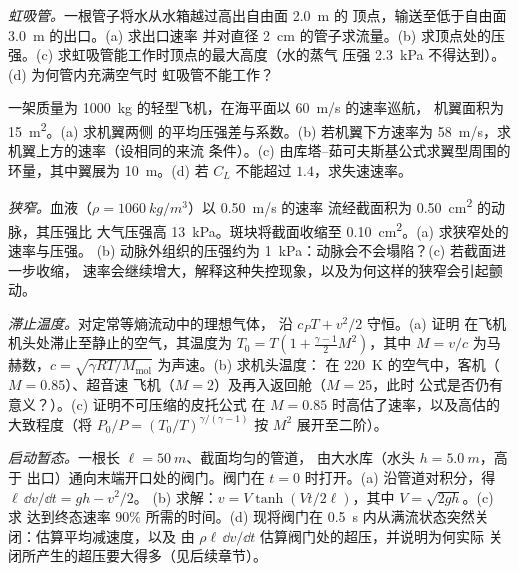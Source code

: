 \begin{exercise}[$\star\star$]\label{exo:b2:euler-bernoulli:7}
\emph{虹吸管。}一根管子将水从水箱越过高出自由面 \qty{2.0}{m} 的
顶点，输送至低于自由面 \qty{3.0}{m} 的出口。(a) 求出口速率
并对直径 \qty{2}{cm} 的管子求流量。(b) 求顶点处的压强。(c)
求虹吸管能工作时顶点的最大高度（水的蒸气
压强 \qty{2.3}{kPa} 不得达到）。(d) 为何管内充满空气时
虹吸管不能工作？
\end{exercise}

\begin{exercise}[$\star\star$]\label{exo:b2:euler-bernoulli:8}
一架质量为 \qty{1000}{kg} 的轻型飞机，在海平面以 \qty{60}{m/s} 的速率巡航，
机翼面积为 \qty{15}{m^2}。(a) 求机翼两侧
的平均压强差与系数。(b) 若机翼下方速率为
\qty{58}{m/s}，求机翼上方的速率（设相同的来流
条件）。(c) 由库塔–茹可夫斯基公式求翼型周围的
环量，其中翼展为 \qty{10}{m}。(d) 若
$C_L$ 不能超过 $1.4$，求失速速率。
\end{exercise}

\begin{exercise}[$\star\star$]\label{exo:b2:euler-bernoulli:9}
\emph{狭窄。}血液（$\rho = \qty{1060}{kg/m^3}$）以 \qty{0.50}{m/s} 的速率
流经截面积为 \qty{0.50}{cm^2} 的动脉，其压强比
大气压强高 \qty{13}{kPa}。斑块将截面收缩至 \qty{0.10}{cm^2}。(a) 求狭窄处的速率与压强。
(b) 动脉外组织的压强约为
\qty{1}{kPa}：动脉会不会塌陷？(c) 若截面进一步收缩，
速率会继续增大，解释这种失控现象，以及为何这样的狭窄会引起颤动。
\end{exercise}

\begin{exercise}[$\star\star\star$]\label{exo:b2:euler-bernoulli:10}
\emph{滞止温度。}对定常等熵流动中的理想气体，
沿 $c_PT + v^2/2$ 守恒。(a) 证明
在飞机机头处滞止至静止的空气，其温度为 $T_0 = T(1 +
\tfrac{\gamma - 1}{2}M^2)$，其中 $M = v/c$ 为马赫数，$c =
\sqrt{\gamma RT/M_{\text{mol}}}$ 为声速。(b) 求机头温度：
在 \qty{220}{K} 的空气中，客机（$M = 0.85$）、超音速
飞机（$M = 2$）及再入返回舱（$M = 25$，此时
公式是否仍有意义？）。(c) 证明不可压缩的皮托公式
在 $M = 0.85$ 时高估了速率，以及高估的大致程度（将
$P_0/P = (T_0/T)^{\gamma/(\gamma - 1)}$ 按 $M^2$ 展开至二阶）。
\end{exercise}

\begin{exercise}[$\star\star\star$]\label{exo:b2:euler-bernoulli:11}
\emph{启动暂态。}一根长 $\ell = \qty{50}{m}$、截面均匀的管道，
由大水库（水头 $h = \qty{5.0}{m}$，高于
出口）通向末端开口处的阀门。阀门在 $t = 0$ 时打开。(a)
沿管道对积分，得 $\ell\,\dd v/\dd t = gh - v^2/2$。
(b) 求解：$v = V\tanh(Vt/2\ell)$，其中 $V = \sqrt{2gh}$。(c) 求
达到终态速率 $90\%$ 所需的时间。(d) 现将阀门在
\qty{0.5}{s} 内从满流状态突然关闭：估算平均减速度，以及
由 $\rho\ell\,\dd v/\dd t$ 估算阀门处的超压，并说明为何实际
关闭所产生的超压要大得多（见后续章节）。
\end{exercise}


